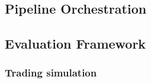 \documentclass[12pt,a4paper,oneside]{article}
\begin{document}
\subsection{Pipeline Orchestration}\label{subsec:pipeline}

%
%


\subsection{Evaluation Framework}\label{subsec:evaluation}



\subsubsection{Trading simulation}\label{subsubsec:trading_simulation}
\end{document}
